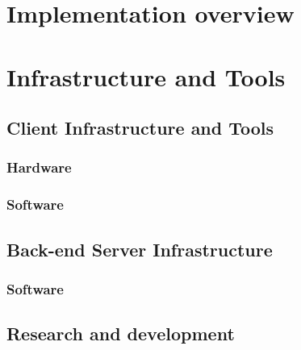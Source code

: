 \section{Implementation overview}

\section{Infrastructure and Tools}

\begin{comment}

Keywords:

    - Hardware for data acquisition - iPad, iPencil
    
    - Client
        - iOS App, developed by author
    
    - Back-end
        - Amazon AWS
        - Flask
        
    - Analysis tools
        - PyCharm - for IDE
        - Python - Language for development
        - Libraries
            - Tensorflow, OpenCV, Pandas, Scikit-Learn - machine learning library for Python

\end{comment}

\subsection{Client Infrastructure and Tools}

\subsubsection{Hardware}

\subsubsection{Software}

\subsection{Back-end Server Infrastructure}

\subsubsection{Software}

\subsection{Research and development}

